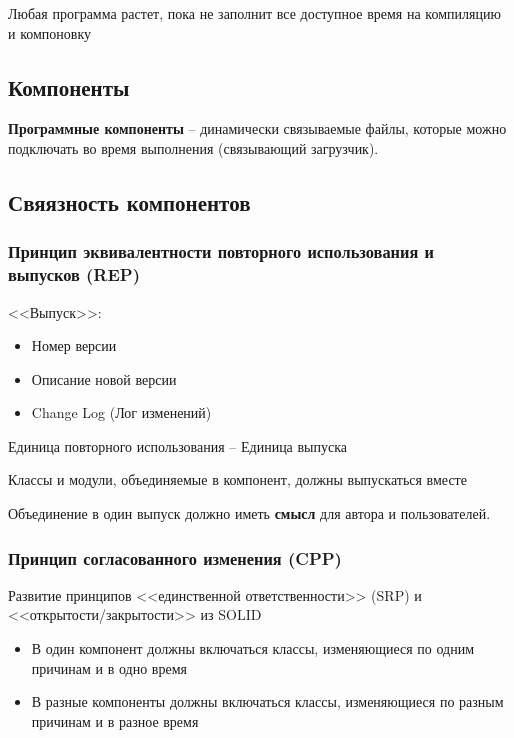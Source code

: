 Любая программа растет, пока не заполнит все доступное время на
компиляцию и компоновку

\subsection{Компоненты}

\textbf{Программные компоненты} -- динамически связываемые файлы,
которые можно подключать во время выполнения (связывающий загрузчик).

\subsection{Свяязность компонентов}

\subsubsection{Принцип эквивалентности повторного использования
и выпусков (REP)}

<<Выпуск>>:

\begin{itemize}
    \item Номер версии
    \item Описание новой версии
    \item Change Log (Лог изменений)
\end{itemize}

Единица повторного использования -- Единица выпуска

Классы и модули, объединяемые в компонент, должны выпускаться вместе

Объединение в один выпуск должно иметь \textbf{смысл}
для автора и пользователей.

\subsubsection{Принцип согласованного изменения (CPP)}

Развитие принципов <<единственной ответственности>> (SRP) и
<<открытости/закрытости>> из SOLID

\begin{itemize}
    \item В один компонент должны включаться классы, изменяющиеся по
        одним причинам и в одно время
    \item В разные компоненты должны включаться классы, изменяющиеся
        по разным причинам и в разное время
\end{itemize}

